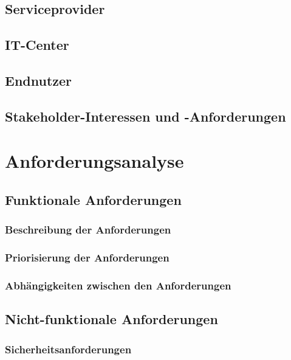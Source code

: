 \documentclass[11pt,a4paper]{scrartcl}
\begin{document}
   \subsection{Serviceprovider}\label{subsec:serviceprovider}
   \subsection{IT-Center}\label{subsec:itcenter}
   \subsection{Endnutzer}\label{subsec:endnutzer}
   \subsection{Stakeholder-Interessen und -Anforderungen}\label{subsec:stakeholder-anforderungen}

\section{Anforderungsanalyse}\label{sec:anforderungen}
   \subsection{Funktionale Anforderungen}\label{subsec:funktionale-anforderungen}
      \subsubsection{Beschreibung der Anforderungen}\label{subsubsec:beschreibung}
      \subsubsection{Priorisierung der Anforderungen}\label{subsubsec:priorisierung}
      \subsubsection{Abhängigkeiten zwischen den Anforderungen}\label{subsubsec:abhaengigkeiten}
   \subsection{Nicht-funktionale Anforderungen}\label{subsec:nicht-funktionale-anforderungen}
      \subsubsection{Sicherheitsanforderungen}\label{subsubsec:sicherheit}
\end{document}
